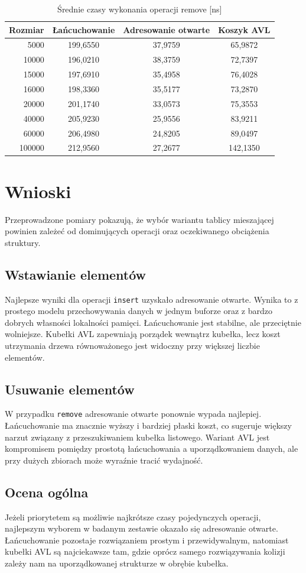 \documentclass[12pt,a4paper]{article}
\begin{document}
\begin{table}[H]
\centering
\caption{Średnie czasy wykonania operacji remove [ns]}
\begin{tabular}{rccc}
\toprule
Rozmiar & Łańcuchowanie & Adresowanie otwarte & Koszyk AVL \\
\midrule
5000 & 199,6550 & 37,9759 & 65,9872 \\
10000 & 196,0210 & 38,3759 & 72,7397 \\
15000 & 197,6910 & 35,4958 & 76,4028 \\
16000 & 198,3360 & 35,5177 & 73,2870 \\
20000 & 201,1740 & 33,0573 & 75,3553 \\
40000 & 205,9230 & 25,9556 & 83,9211 \\
60000 & 206,4980 & 24,8205 & 89,0497 \\
100000 & 212,9560 & 27,2677 & 142,1350 \\
\bottomrule
\end{tabular}
\end{table}

\section{Wnioski}

Przeprowadzone pomiary pokazują, że wybór wariantu tablicy mieszającej powinien zależeć od dominujących operacji oraz oczekiwanego obciążenia struktury.

\subsection{Wstawianie elementów}
Najlepsze wyniki dla operacji \texttt{insert} uzyskało adresowanie otwarte. Wynika to z prostego modelu przechowywania danych w jednym buforze oraz z bardzo dobrych własności lokalności pamięci. Łańcuchowanie jest stabilne, ale przeciętnie wolniejsze. Kubełki AVL zapewniają porządek wewnątrz kubełka, lecz koszt utrzymania drzewa równoważonego jest widoczny przy większej liczbie elementów.

\subsection{Usuwanie elementów}
W przypadku \texttt{remove} adresowanie otwarte ponownie wypada najlepiej. Łańcuchowanie ma znacznie wyższy i bardziej płaski koszt, co sugeruje większy narzut związany z przeszukiwaniem kubełka listowego. Wariant AVL jest kompromisem pomiędzy prostotą łańcuchowania a uporządkowaniem danych, ale przy dużych zbiorach może wyraźnie tracić wydajność.

\subsection{Ocena ogólna}
Jeżeli priorytetem są możliwie najkrótsze czasy pojedynczych operacji, najlepszym wyborem w badanym zestawie okazało się adresowanie otwarte. Łańcuchowanie pozostaje rozwiązaniem prostym i przewidywalnym, natomiast kubełki AVL są najciekawsze tam, gdzie oprócz samego rozwiązywania kolizji zależy nam na uporządkowanej strukturze w obrębie kubełka.
\end{document}
